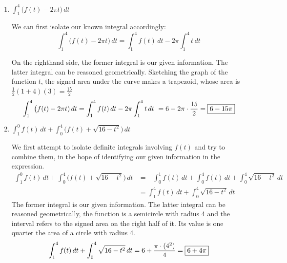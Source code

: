 \documentclass{article}
\begin{document}
\begin{enumerate}
\begin{enumerate}[resume]

        \item
        \begin{problem}
            $\displaystyle \int_1^4 \big(f(t)-2\pi t)\,dt$
        \end{problem}
        \pspace{\vfill}

\begin{solution}
    We can first isolate our known integral accordingly: \[\displaystyle \int_1^4 \big(f(t)-2\pi t)\,dt = \int_1^4 f(t) \, dt - 2\pi \int_1^4 t\, dt\]
    
    On the righthand side, the former integral is our given information. The latter integral can be reasoned geometrically. Sketching the graph of the function $t$, the signed area under the curve makes a trapezoid, whose area is $\frac{1}{2}(1+4)(3)=\frac{15}{2}$
   \[\int_1^4 \big(f(t)-2\pi t)\,dt = \int_1^4 f(t) \, dt - 2\pi \int_1^4 t\, dt\ = 6 - 2\pi \cdot \frac{15}{2} = \fbox{$6-15\pi$}\]
\end{solution}
        
        \item 
        \begin{problem}
        $\displaystyle
        \int_1^0 f(t)\,dt + \int_0^4 \big(f(t)+\sqrt{16-t^2}\big)\,dt$
        \end{problem}

        \begin{solution}
        We first attempt to isolate definite integrals involving $f(t)$ and try to combine them, in the hope of identifying our given information in the expression.
         \begin{align*}
         \int_1^0 f(t)\,dt + \int_0^4 \big(f(t)+\sqrt{16-t^2}\big)\,dt &= -\int_0^1f(t) \, dt + \int_0^4 f(t) \, dt + \int_0^4 \sqrt{16-t^2}\, dt \\
         &= \int_1^4 f(t) \, dt+ \int_0^4 \sqrt{16-t^2}\, dt
         \end{align*}
         The former integral is our given information. The latter integral can be reasoned geometrically, the function is a semicircle with radius 4 and the interval refers to the signed area on the right half of it. Its value is one quarter the area of a circle with radius 4.
         \[\int_1^4 f(t) \, dt+ \int_0^4 \sqrt{16-t^2}\, dt = 6 + \frac{\pi\cdot (4^2)}{4} = \fbox{$6+4\pi$}\]
        \end{solution}
    \end{enumerate}


\end{enumerate}
\end{document}
